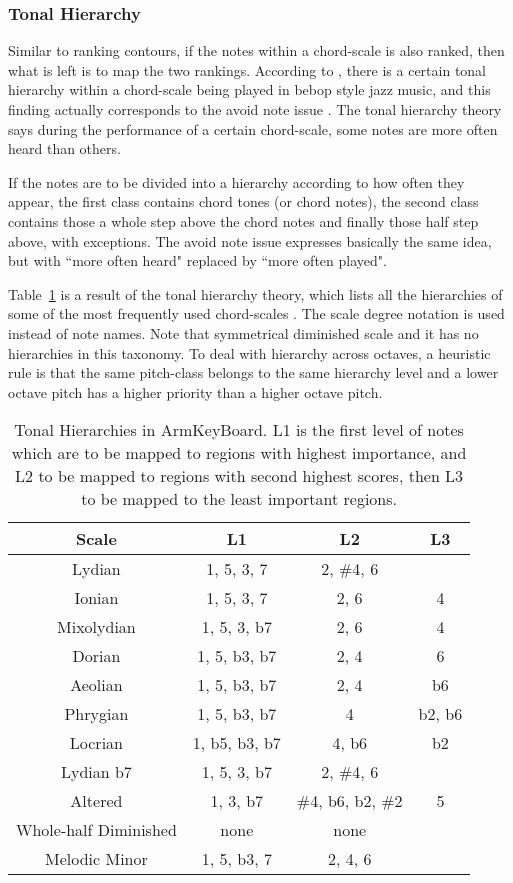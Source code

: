 \subsubsection{Tonal Hierarchy}
Similar to ranking contours, if the notes within a chord-scale is also ranked, then what is left is to map the two rankings. According to \cite{jarvinen1995tonal}, there is a certain tonal hierarchy within a chord-scale being played in bebop style jazz music, and this finding actually corresponds to the avoid note issue \cite{nettles1987harmony}. The tonal hierarchy theory says during the performance of a certain chord-scale, some notes are more often heard than others.

If the notes are to be divided into a hierarchy according to how often they appear, the first class contains chord tones (or chord notes), the second class contains those a whole step above the chord notes and finally those half step above, with exceptions. The avoid note issue expresses basically the same idea, but with ``more often heard" replaced by ``more often played".

Table~\ref{tab:5-tonalhierarchy} is a result of the tonal hierarchy theory, which lists all the hierarchies \cite{nettles1987harmony} of some of the most frequently used chord-scales \cite{burtonJazzImpro}. The scale degree notation is
used instead of note names. Note that symmetrical diminished scale and it has no hierarchies in this taxonomy. To deal with hierarchy across octaves, a heuristic rule is that the same pitch-class belongs to the same hierarchy level and a lower octave pitch has a higher priority than a higher octave pitch.

\begin{table}
\centering
\caption{Tonal Hierarchies in ArmKeyBoard. L1 is the first level of notes which are to be mapped to regions with highest importance, and L2 to be mapped to regions with second highest scores, then L3 to be mapped to the least important regions.}
\begin{tabular}{|c|c|c|c|} \hline
Scale & L1 & L2 & L3\\ \hline
Lydian & 1, 5, 3, 7& 2, \#4, 6 & \\ \hline
Ionian & 1, 5, 3, 7& 2, 6 & 4\\ \hline
Mixolydian & 1, 5, 3, b7 & 2, 6 & 4\\ \hline
Dorian & 1, 5, b3, b7& 2, 4 & 6\\ \hline
Aeolian & 1, 5, b3, b7& 2, 4 & b6\\ \hline
Phrygian & 1, 5, b3, b7& 4 & b2, b6\\ \hline
Locrian & 1, b5, b3, b7& 4, b6 & b2\\ \hline
Lydian b7 & 1, 5, 3, b7& 2, \#4, 6 &\\ \hline
Altered & 1, 3, b7& \#4, b6, b2, \#2 & 5\\ \hline
Whole-half Diminished & none & none &\\ \hline
Melodic Minor & 1, 5, b3, 7& 2, 4, 6 &\\ \hline
\end{tabular}
\label{tab:5-tonalhierarchy}
\end{table}

